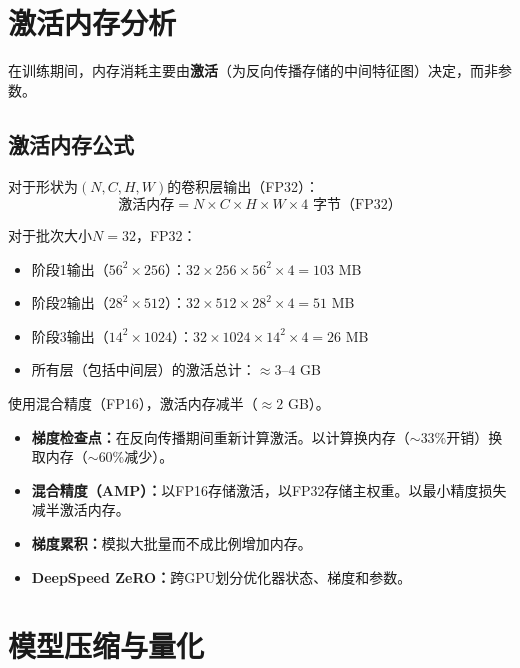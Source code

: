 \section{激活内存分析}

在训练期间，内存消耗主要由\textbf{激活}（为反向传播存储的中间特征图）决定，而非参数。

\subsection{激活内存公式}

对于形状为$(N, C, H, W)$的卷积层输出（FP32）：
\begin{equation}
\text{激活内存} = N \times C \times H \times W \times 4 \text{ 字节（FP32）}
\end{equation}

\begin{example}
对于批次大小$N = 32$，FP32：
\begin{itemize}
    \item 阶段1输出（$56^2 \times 256$）：$32 \times 256 \times 56^2 \times 4 = 103$ MB
    \item 阶段2输出（$28^2 \times 512$）：$32 \times 512 \times 28^2 \times 4 = 51$ MB
    \item 阶段3输出（$14^2 \times 1024$）：$32 \times 1024 \times 14^2 \times 4 = 26$ MB
    \item 所有层（包括中间层）的激活总计：$\approx 3$--$4$ GB
\end{itemize}
使用混合精度（FP16），激活内存减半（$\approx 2$ GB）。
\end{example}

\begin{properties}[减少激活内存的方法]
\begin{itemize}
    \item \textbf{梯度检查点：}在反向传播期间重新计算激活。以计算换内存（$\sim$33\%开销）换取内存（$\sim$60\%减少）。
    \item \textbf{混合精度（AMP）：}以FP16存储激活，以FP32存储主权重。以最小精度损失减半激活内存。
    \item \textbf{梯度累积：}模拟大批量而不成比例增加内存。
    \item \textbf{DeepSpeed ZeRO：}跨GPU划分优化器状态、梯度和参数。
\end{itemize}
\end{properties}

\section{模型压缩与量化}

